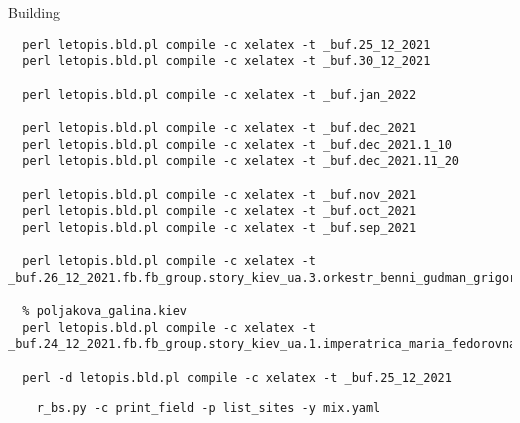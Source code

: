  
 
 
 
 
Building

\begin{verbatim}
  perl letopis.bld.pl compile -c xelatex -t _buf.25_12_2021
  perl letopis.bld.pl compile -c xelatex -t _buf.30_12_2021

  perl letopis.bld.pl compile -c xelatex -t _buf.jan_2022

  perl letopis.bld.pl compile -c xelatex -t _buf.dec_2021
  perl letopis.bld.pl compile -c xelatex -t _buf.dec_2021.1_10
  perl letopis.bld.pl compile -c xelatex -t _buf.dec_2021.11_20

  perl letopis.bld.pl compile -c xelatex -t _buf.nov_2021
  perl letopis.bld.pl compile -c xelatex -t _buf.oct_2021
  perl letopis.bld.pl compile -c xelatex -t _buf.sep_2021

  perl letopis.bld.pl compile -c xelatex -t _buf.26_12_2021.fb.fb_group.story_kiev_ua.3.orkestr_benni_gudman_grigorij_chapkis_1962

  % poljakova_galina.kiev
  perl letopis.bld.pl compile -c xelatex -t _buf.24_12_2021.fb.fb_group.story_kiev_ua.1.imperatrica_maria_fedorovna

  perl -d letopis.bld.pl compile -c xelatex -t _buf.25_12_2021

\end{verbatim}

\begin{verbatim}
	r_bs.py -c print_field -p list_sites -y mix.yaml
\end{verbatim}
